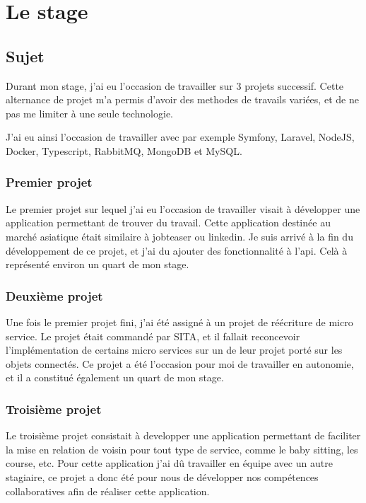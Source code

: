 \documentclass[../rapport.tex]{subfiles}
\begin{document}
    \chapter{Le stage}
    \section{Sujet}
        Durant mon stage, j'ai eu l'occasion de travailler sur 3 projets successif.
        Cette alternance de projet m'a permis d'avoir des methodes de travails variées,
        et de ne pas me limiter à une seule technologie.

        J'ai eu ainsi l'occasion de travailler avec par exemple Symfony,
        Laravel, NodeJS, Docker, Typescript, RabbitMQ, MongoDB et MySQL.

        \subsection{Premier projet}
        Le premier projet sur lequel j'ai eu l'occasion de travailler visait à
        développer une application permettant de trouver du travail. Cette
        application destinée au marché asiatique était similaire à jobteaser ou
        linkedin. Je suis arrivé à la fin du développement de ce projet, et j'ai du 
        ajouter des fonctionnalité à l'\gls{api}. Celà à représenté environ un quart de mon
        stage.

        \subsection{Deuxième projet}
        Une fois le premier projet fini, j'ai été assigné à un projet de
        réécriture de micro service. 
        Le projet était commandé par SITA, et il fallait reconcevoir l'implémentation
        de certains micro services sur un de leur projet porté sur les objets
        connectés.
        Ce projet a été l'occasion pour moi de travailler en autonomie, et il a
        constitué également un quart de mon stage.

        \subsection{Troisième projet}
        Le troisième projet consistait à developper une application permettant
        de faciliter la mise en relation de voisin pour tout type de service, comme
        le baby sitting, les course, etc. Pour cette application j'ai dû travailler en
        équipe avec un autre stagiaire, ce projet a donc été pour nous de développer 
        nos compétences collaboratives afin de réaliser cette application.
\end{document}
